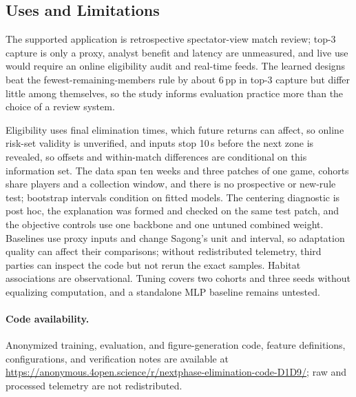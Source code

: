 \documentclass[sigconf,anonymous,nonacm]{acmart}
\newcommand{\artifacturl}{\url{https://anonymous.4open.science/r/nextphase-elimination-code-D1D9/}}
\begin{document}
\subsection{Uses and Limitations}
\label{sec:discussion:limits}
The supported application is retrospective spectator-view match review; top-3 capture is only a proxy, analyst benefit and latency are unmeasured, and live use would require an online eligibility audit and real-time feeds. The learned designs beat the fewest-remaining-members rule by about 6\,pp in top-3 capture but differ little among themselves, so the study informs evaluation practice more than the choice of a review system.

Eligibility uses final elimination times, which future returns can affect, so online risk-set validity is unverified, and inputs stop 10\,s before the next zone is revealed, so offsets and within-match differences are conditional on this information set. The data span ten weeks and three patches of one game, cohorts share players and a collection window, and there is no prospective or new-rule test; bootstrap intervals condition on fitted models. The centering diagnostic is post hoc, the explanation was formed and checked on the same test patch, and the objective controls use one backbone and one untuned combined weight. Baselines use proxy inputs and change Sagong's unit and interval, so adaptation quality can affect their comparisons; without redistributed telemetry, third parties can inspect the code but not rerun the exact samples. Habitat associations are observational. Tuning covers two cohorts and three seeds without equalizing computation, and a standalone MLP baseline remains untested.

\paragraph{Code availability.}
Anonymized training, evaluation, and figure-generation code, feature definitions, configurations, and verification notes are available at \artifacturl{}; raw and processed telemetry are not redistributed.
\end{document}
